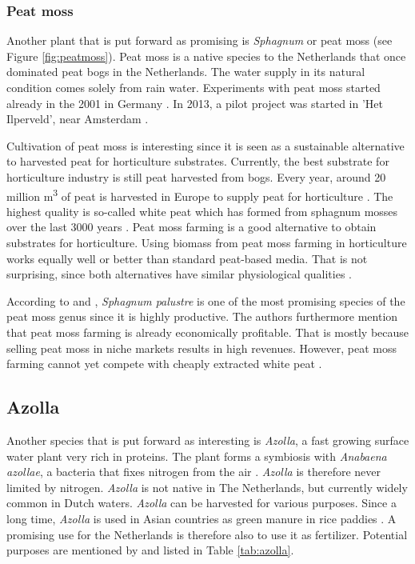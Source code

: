 {\subsubsection{Peat moss}

Another plant that is put forward as promising is \textit{Sphagnum} or peat moss (see Figure \ref{fig:peatmoss}). Peat moss is a native species to the Netherlands that once dominated peat bogs in the Netherlands. The water supply in its natural condition comes solely from rain water. Experiments with peat moss started already in the 2001 in Germany \citep{gaudig2014sphagnum}. In 2013, a pilot project was started in 'Het Ilperveld', near Amsterdam \citep{van2013werk}. 

Cultivation of peat moss is interesting since it is seen as a sustainable alternative to harvested peat for horticulture substrates. Currently, the best substrate for horticulture industry is still peat harvested from bogs. Every year, around 20 million m\textsuperscript{3} of peat is harvested in Europe to supply peat for horticulture \citep{altmann2008socio}. The highest quality is so-called white peat which has formed from sphagnum mosses over the last 3000 years \citep{gaudig2014sphagnum}. Peat moss farming is a good alternative to obtain substrates for horticulture. Using biomass from peat moss farming in horticulture works equally well or better than standard peat-based media. That is not surprising, since both alternatives have similar physiological qualities \citep{gaudig2014sphagnum}. 

According to \citet{gaudig2014sphagnum} and \citet{wichtmann2016paludiculture}, \textit{Sphagnum palustre} is one of the most promising species of the peat moss genus since it is highly productive. The authors furthermore mention that peat moss farming is already economically profitable. That is mostly because selling peat moss in niche markets results in high revenues. However, peat moss farming cannot yet compete with cheaply extracted white peat \citep{gaudig2014sphagnum}.

\subsection{Azolla}

Another species that is put forward as interesting is \textit{Azolla}, a fast growing surface water plant very rich in proteins. The plant forms a symbiosis with \textit{Anabaena azollae}, a bacteria that fixes nitrogen from the air \citep{wagner1997azolla}. \textit{Azolla} is therefore never limited by nitrogen. \textit{Azolla} is not native in The Netherlands, but currently widely common in Dutch waters. \textit{Azolla} can be harvested for various purposes. Since a long time, \textit{Azolla} is used in Asian countries as green manure in rice paddies \citep{wagner1997azolla}. A promising use for the Netherlands is therefore also to use it as fertilizer. Potential purposes are mentioned by \citet{wagner1997azolla} and listed in Table \ref{tab:azolla}.

}
